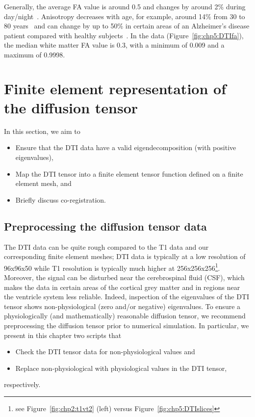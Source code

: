 Generally, the average FA value is around 0.5 and changes by around 2\%
during day/night~\cite{voldsbekk2020evidence}.  Anisotropy decreases
with age, for example, around 14\% from 30 to 80
years~\cite{kochunov2011fractional} and can change by up to
50\% in certain areas of an Alzheimer's disease patient compared with
healthy subjects~\cite{naggara2006diffusion}. In the  data 
(Figure~\ref{fig:chp5:DTIfa}), the median white matter FA value is
0.3, with a minimum of 0.009 and a maximum of 0.9998.

\section{Finite element representation of the diffusion tensor}

In this section, we aim to
\begin{itemize}
\item
  Ensure that the DTI data have a valid eigendecomposition (with positive eigenvalues),
\item
  Map the DTI tensor into a finite element tensor function defined on
  a finite element mesh, and
\item
  Briefly discuss co-registration.
\end{itemize}

\subsection{Preprocessing the diffusion tensor data}

The DTI data can be quite rough compared to the T1 data and our
corresponding finite element meshes; DTI data is typically at a low resolution 
of 96x96x50 while T1 resolution is typically much higher at 
256x256x256\footnote{see Figure~\ref{fig:chp2:t1vt2} (left) versus 
Figure~\ref{fig:chp5:DTIslices}}. Moreover, the signal can be disturbed near 
the cerebrospinal fluid (CSF), which makes the data in certain areas of the 
cortical grey matter and in regions near the ventricle system less reliable. 
Indeed, inspection of the eigenvalues of the DTI tensor shows 
non-physiological (zero and/or negative) eigenvalues. To ensure a 
physiologically (and mathematically) reasonable diffusion tensor, we recommend 
preprocessing the diffusion tensor prior to numerical simulation. In 
particular, we present in this chapter two scripts that
\begin{itemize}
\item
  Check the DTI tensor data for non-physiological values and
\item
  Replace non-physiological with physiological values in the DTI tensor,
\end{itemize}
respectively.

